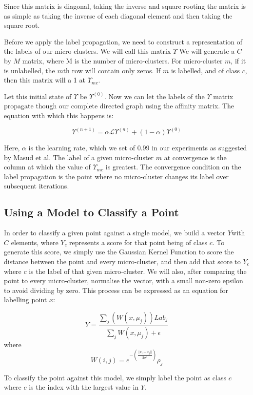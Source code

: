 \documentclass[12pt,a4paper,oneside]{report}
\begin{document}
Since this matrix is diagonal, taking the inverse and square rooting the matrix is as simple as taking the inverse of each diagonal element and then taking the square root.

Before we apply the label propagation, we need to construct a representation of the labels of our micro-clusters. We will call this matrix $\Upsilon$ We will generate a $C$ by $M$ matrix, where M is the number of micro-clusters. For micro-cluster $m$, if it is unlabelled, the $m$th row will contain only zeros. If $m$ is labelled, and of class $c$, then this matrix will a 1 at $\Upsilon_{mc}$.

Let this initial state of $\Upsilon$ be $\Upsilon^{(0)}$. Now we can let the labels of the $\Upsilon$ matrix propagate though our complete directed graph using the affinity matrix. The equation with which this happens is:

\[ \Upsilon^{(n+1)} = \alpha \mathscr{L} \Upsilon^{(n)} + (1 - \alpha) \Upsilon^{(0)}\] 

Here, $\alpha $ is the learning rate, which we set of 0.99 in our experiments as suggested by Masud et al.\cite{TechRep} The label of a given micro-cluster $m$ at convergence is the column at which the value of $\Upsilon_{mc}$ is greatest. The convergence condition on the label propagation is the point where no micro-cluster changes its label over subsequent iterations. 

\subsection*{Using a Model to Classify a Point}

In order to classify a given point against a single model, we build a vector $Y$with $C$ elements, where $Y_c$ represents a score for that point being of class $c$. To generate this score, we simply use the Gaussian Kernel Function to score the distance between the point and every micro-cluster, and then add that score to $Y_c$ where $c$ is the label of that given micro-cluster. We will also, after comparing the point to every micro-cluster, normalise the vector, with a small non-zero epsilon to avoid dividing by zero. This process can be expressed as an equation for labelling point $x$:

\[ Y = \frac{\sum_j(W(x,\mu_j))Lab_j}{\sum_j{W(x,\mu_j)} + \epsilon} \]
where
\[W(i,j) = e^{-(\frac{||x_i-x_j||}{2\sigma^2})}\rho_j\]

To classify the point against this model, we simply label the point as class $c$ where $c$ is the index with the largest value in $Y$.
\end{document}
